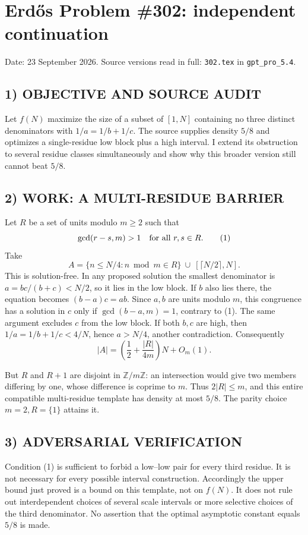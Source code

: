 \section{Erd\H{o}s Problem \#302: independent continuation}
\noindent Date: 23 September 2026. Source versions read in full: \texttt{302.tex} in \texttt{gpt\_pro\_5.4}.

\subsection*{1) OBJECTIVE AND SOURCE AUDIT}
Let $f(N)$ maximize the size of a subset of $[1,N]$ containing no three
distinct denominators with $1/a=1/b+1/c$. The source supplies density
$5/8$ and optimizes a single-residue low block plus a high interval.
I extend its obstruction to several residue classes simultaneously and
show why this broader version still cannot beat $5/8$.

\subsection*{2) WORK: A MULTI-RESIDUE BARRIER}
Let $R$ be a set of units modulo $m\ge2$ such that
\[
 \gcd(r-s,m)>1\quad\hbox{for all }r,s\in R. \tag{1}
\]
Take
\[
 A=\{n\le N/4:n\bmod m\in R\}\ \cup\ [\lceil N/2\rceil,N].
\]
This is solution-free. In any proposed solution the smallest denominator
is $a=bc/(b+c)<N/2$, so it lies in the low block. If $b$ also lies there,
the equation becomes $(b-a)c=ab$. Since $a,b$ are units modulo $m$, this
congruence has a solution in $c$ only if $\gcd(b-a,m)=1$, contrary to
(1). The same argument excludes $c$ from the low block. If both $b,c$
are high, then $1/a=1/b+1/c<4/N$, hence $a>N/4$, another contradiction.
Consequently
\[
 |A|=\left(\frac12+\frac{|R|}{4m}\right)N+O_m(1).
\]

But $R$ and $R+1$ are disjoint in $\mathbb Z/m\mathbb Z$: an intersection
would give two members differing by one, whose difference is coprime to
$m$. Thus $2|R|\le m$, and this entire compatible multi-residue template
has density at most $5/8$. The parity choice $m=2,R=\{1\}$ attains it.

\subsection*{3) ADVERSARIAL VERIFICATION}
Condition (1) is sufficient to forbid a low--low pair for every third
residue. It is not necessary for every possible interval construction.
Accordingly the upper bound just proved is a bound on this template,
not on $f(N)$. It does not rule out interdependent choices of several
scale intervals or more selective choices of the third denominator.
No assertion that the optimal asymptotic constant equals $5/8$ is made.

